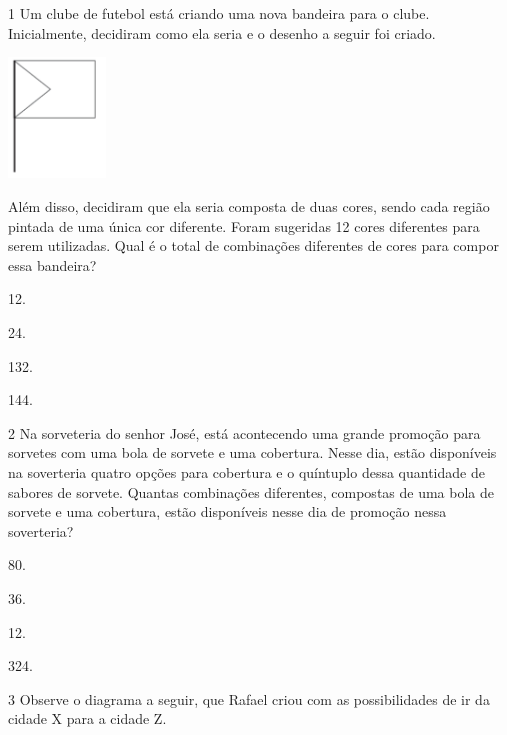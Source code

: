 \begin{mdframed}[linewidth=2pt,linecolor=salmao,roundcorner=2pt]
\vspace{2cm}
\end{mdframed}


\num{1} Um clube de futebol está criando uma nova bandeira para o clube.
Inicialmente, decidiram como ela seria e o desenho a seguir foi criado.

\includegraphics[width=1.02511in,height=1.26282in]{media/image140.png}

Além disso, decidiram que ela seria composta de duas cores, sendo cada
região pintada de uma única cor diferente. Foram sugeridas 12 cores
diferentes para serem utilizadas. Qual é o total de combinações
diferentes de cores para compor essa bandeira?

\begin{escolha}
\item
  12.
\item
  24.
\item
  132.
\item
  144.
\end{escolha}

\num{2} Na sorveteria do senhor José, está acontecendo uma grande promoção para
sorvetes com uma bola de sorvete e uma cobertura. Nesse dia, estão
disponíveis na soverteria quatro opções para cobertura e o quíntuplo dessa
quantidade de sabores de sorvete. Quantas combinações diferentes, compostas de uma bola de
sorvete e uma cobertura, estão disponíveis nesse dia de promoção nessa
soverteria?

\begin{escolha}
\item
  80.
\item
  36.
\item
  12.
\item
  324.
\end{escolha}

\num{3} Observe o diagrama a seguir, que Rafael criou com as possibilidades de ir
da cidade X para a cidade Z.

